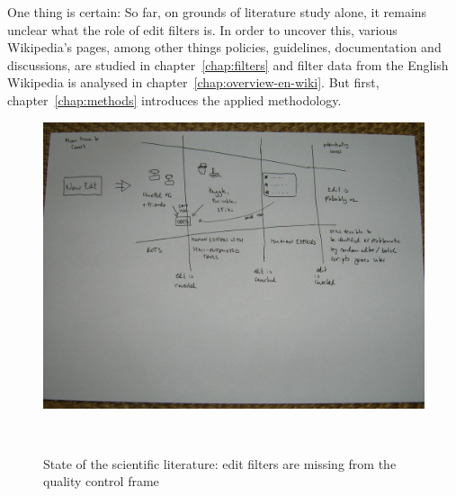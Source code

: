 One thing is certain: So far, on grounds of literature study alone, it remains unclear what the role of edit filters is.
In order to uncover this, various Wikipedia's pages, among other things policies, guidelines, documentation and discussions, are studied in chapter~\ref{chap:filters} and filter data from the English Wikipedia is analysed in chapter~\ref{chap:overview-en-wiki}.
But first, chapter~\ref{chap:methods} introduces the applied methodology.

\begin{figure}
\centering
  \includegraphics[width=0.9\columnwidth]{pics/funnel-diagramm-no-filters.JPG}
  \caption{State of the scientific literature: edit filters are missing from the quality control frame}~\label{fig:funnel-no-filters}
\end{figure}


